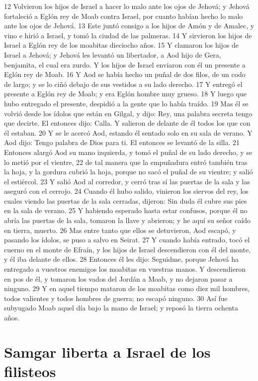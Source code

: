 12 Volvieron los hijos de Israel a hacer lo malo ante los ojos de Jehová; y Jehová fortaleció a Eglón rey de Moab contra Israel, por cuanto habían hecho lo malo ante los ojos de Jehová.
13 Este juntó consigo a los hijos de Amón y de Amalec, y vino e hirió a Israel, y tomó la ciudad de las palmeras.
14 Y sirvieron los hijos de Israel a Eglón rey de los moabitas dieciocho años.
15 Y clamaron los hijos de Israel a Jehová; y Jehová les levantó un libertador, a Aod hijo de Gera, benjamita, el cual era zurdo. Y los hijos de Israel enviaron con él un presente a Eglón rey de Moab.
16 Y Aod se había hecho un puñal de dos filos, de un codo   de largo; y se lo ciñó debajo de sus vestidos a su lado derecho.
17 Y entregó el presente a Eglón rey de Moab; y era Eglón hombre muy grueso.
18 Y luego que hubo entregado el presente, despidió a la gente que lo había traído.
19 Mas él se volvió desde los ídolos que están en Gilgal, y dijo: Rey, una palabra secreta tengo que decirte. El entonces dijo: Calla. Y salieron de delante de él todos los que con él estaban.
20 Y se le acercó Aod, estando él sentado solo en su sala de verano. Y Aod dijo: Tengo palabra de Dios para ti. El entonces se levantó de la silla.
21 Entonces alargó Aod su mano izquierda, y tomó el puñal de su lado derecho, y se lo metió por el vientre,
22 de tal manera que la empuñadura entró también tras la hoja, y la gordura cubrió la hoja, porque no sacó el puñal de su vientre; y salió el estiércol.
23 Y salió Aod al corredor, y cerró tras sí las puertas de la sala y las aseguró con el cerrojo.
24 Cuando él hubo salido, vinieron los siervos del rey, los cuales viendo las puertas de la sala cerradas, dijeron: Sin duda él cubre sus pies en la sala de verano.
25 Y habiendo esperado hasta estar confusos, porque él no abría las puertas de la sala, tomaron la llave y abrieron; y he aquí su señor caído en tierra, muerto.
26 Mas entre tanto que ellos se detuvieron, Aod escapó, y pasando los ídolos, se puso a salvo en Seirat.
27 Y cuando había entrado, tocó el cuerno en el monte de Efraín, y los hijos de Israel descendieron con él del monte, y él iba delante de ellos.
28 Entonces él les dijo: Seguidme, porque Jehová ha entregado a vuestros enemigos los moabitas en vuestras manos. Y descendieron en pos de él, y tomaron los vados del Jordán a Moab, y no dejaron pasar a ninguno.
29 Y en aquel tiempo mataron de los moabitas como diez mil hombres, todos valientes y todos hombres de guerra; no escapó ninguno.
30 Así fue subyugado Moab aquel día bajo la mano de Israel; y reposó la tierra ochenta años.
\section*{Samgar liberta a Israel de los filisteos}

